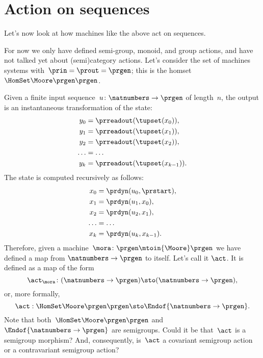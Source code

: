 

 \section{Action on sequences}

    Let's now look at how machines like the above act on sequences.

    For now we only have defined semi-group, monoid, and group actions, and have not talked yet about (semi)category actions.
    Let's consider the set of machines systems with~$\prin = \prout = \prgen$; this is the homset~$\HomSet\Moore\prgen\prgen$.

    Given a finite input sequence~$u\colon \natnumbers \to \prgen$ of length~$n$, the output is an instantaneous transformation of the state:
    \begin{equation}
        \label{eq:actions-on-sequences-y}
        \begin{aligned}
            y_0   & = \prreadout(\tupset(x_0)), \\
            y_1   & = \prreadout(\tupset(x_1)), \\
            y_2   & = \prreadout(\tupset(x_2)), \\
            \dots & = \dots \\
            y_{k} & = \prreadout(\tupset(x_{k-1})).
        \end{aligned}
    \end{equation}
    The state is computed recursively as follows:
    \begin{equation}
        \label{eq:actions-on-sequences-x}
        \begin{aligned}
            x_0   & = \prdyn(u_0, \prstart), \\
            x_1   & = \prdyn(u_1, x_0), \\
            x_2   & = \prdyn(u_2, x_1), \\
            \dots & = \dots \\
            x_{k} & = \prdyn(u_{k}, x_{k-1}).
        \end{aligned}
    \end{equation}
    Therefore, given a machine~$\mora \colon \prgen \mtoin{\Moore} \prgen$ we have defined a map from $\natnumbers \to \prgen$ to itself.
    Let's call it $\act$.
    It is defined as a map of the form
    \begin{equation}
        \label{eq:actions-on-sequences-1}
        \act_{\mora}\colon  (\natnumbers \to \prgen)  \sto  (\natnumbers \to \prgen),
    \end{equation}
    or, more formally,
    \begin{equation}
        \label{eq:actions-on-sequences-2}
        \act: \HomSet\Moore\prgen\prgen \sto \Endof {\natnumbers \to \prgen}.
    \end{equation}
    Note that both~$\HomSet\Moore\prgen\prgen$ and $\Endof {\natnumbers \to \prgen}$ are semigroups.
    Could it be that~$\act$ is a semigroup morphism?
    And, consequently, is~$\act$ a covariant semigroup action or a contravariant semigroup action?

